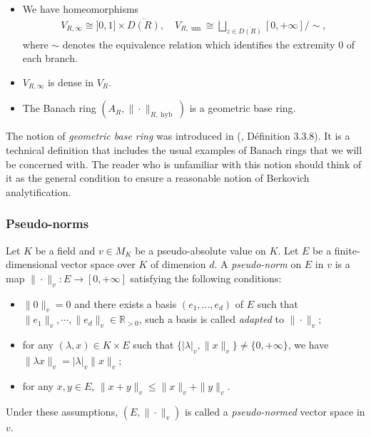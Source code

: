 \documentclass [11pt,reqno]{amsart}
\def\bR{{\mathbb{R}}}
\newcommand{\1}{\mathmybb{1}}
\def\hyb{\operatorname{hyb}}
\def\um{\operatorname{um}}
\begin{document}
\begin{proposition}
\label{prop:global_space_of_sav_compact_disc}
\begin{itemize}
	\item[(i)] We have homeomorphisms 
\begin{align*}
V_{R,\infty} \cong ]0,1]\times \overline{D(R)}, \quad V_{R,\um} \cong \bigsqcup_{z \in \overline{D(R)}} [0,+\infty]/\sim,
\end{align*}	
where $\sim$ denotes the equivalence relation which identifies the extremity $0$ of each branch.
	\item[(ii)] $V_{R,\infty}$ is dense in $V_{R}$.
	\item[(iii)] The Banach ring $(A_R,\|\cdot\|_{R,\hyb})$ is a geometric base ring. 
\end{itemize}
\end{proposition} 

\begin{remark}
\label{remark:geoemtric_base_ring}
The notion of \emph{geometric base ring} was introduced in (\cite{LemanissierPoineau24}, Définition 3.3.8). It is a technical definition that includes the usual examples of Banach rings that we will be concerned with. The reader who is unfamiliar with this notion should think of it as the general condition to ensure a reasonable notion of Berkovich analytification. %
\end{remark}

\subsubsection{Pseudo-norms}
\label{subsub:pseudo-norms}

Let $K$ be a field and $v\in M_K$ be a pseudo-absolute value on $K$. Let $E$ be a finite-dimensional vector space over $K$ of dimension $d$. A \emph{pseudo-norm} on $E$ in $v$ is a map $\|\cdot\|_{v} : E \to [0,+\infty]$ satisfying the following conditions:
\begin{itemize}
	\item[(i)] $\|0\|_v = 0$ and there exists a basis $(e_1,...,e_d)$ of $E$ such that $\|e_1\|_v,\cdots,\|e_d\|_v \in \bR_{>0}$, such a basis is called \emph{adapted} to $\|\cdot\|_{v}$;
	\item[(ii)] for any $(\lambda,x)\in K\times E$ such that $\{|\lambda|_v,\|x\|_v\}\neq\{0,+\infty\}$, we have $\|\lambda x\|_v=|\lambda|_v\|x\|_v$;
	\item[(iii)] for any $x,y\in E$, $\|x+y\|_v\leq \|x\|_v+\|y\|_v$.
\end{itemize}
Under these assumptions, $(E,\|\cdot\|_v)$ is called a \emph{pseudo-normed} vector space in $v$. 
\end{document}

